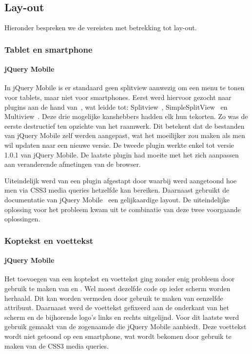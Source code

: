\subsection{Lay-out}
Hieronder bespreken we de vereisten met betrekking tot lay-out.

\subsubsection{Tablet en smartphone}

\paragraph{jQuery Mobile} 
In jQuery Mobile is er standaard geen splitview aanwezig om een menu te tonen voor tablets, maar niet voor smartphones. Eerst werd hiervoor gezocht naar plugins aan de hand van~\cite{Deering2012}, wat leidde tot: Splitview~\cite{Rahman2013}, SimpleSplitView~\cite{Yared2013} en Multiview~\cite{Franck2012}. Deze drie mogelijke kanshebbers hadden elk hun tekorten. Zo was de eerste destructief ten opzichte van het raamwerk. Dit betekent dat de bestanden van jQuery Mobile zelf werden aangepast, wat het moeilijker zou maken als men wil updaten naar een nieuwe versie. De tweede plugin werkte enkel tot versie 1.0.1 van jQuery Mobile. De laatste plugin had moeite met het zich  aanpassen aan veranderende afmetingen van de browser. 

Uiteindelijk werd van een plugin afgestapt door \cite{Hadlock2012} waarbij werd aangetoond hoe men via CSS3 media queries hetzelfde kan bereiken. Daarnaast gebruikt de documentatie van jQuery Mobile~\cite{JQuery2012b} een gelijkaardige layout. De uiteindelijke oplossing voor het probleem kwam uit te combinatie van deze twee voorgaande oplossingen.

\subsubsection{Koptekst en voettekst}

\paragraph{jQuery Mobile}
Het toevoegen van een koptekst en voettekst ging zonder enig probleem door gebruik te maken van  en . Wel moest dezelfde code op ieder scherm worden herhaald. Dit kan worden vermeden door gebruik te maken van eenzelfde  attribuut. Daarnaast werd de voettekst gefixeerd aan de onderkant van het scherm en de bijhorende logo's links en rechts uitgelijnd. Voor dit laatste werd gebruik gemaakt van de zogenaamde  die jQuery Mobile aanbiedt. Deze voettekst wordt niet getoond op een smartphone, wat wordt bekomen door gebruik te maken van de CSS3 media queries.

